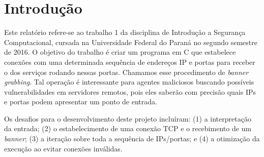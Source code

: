 \documentclass{sig-alternate-05-2015}
\begin{document}
%
\author{
%
%
\alignauthor
Renan Domingos Merlin Greca\\
			\\
\alignauthor
José Robyson Aggio Molinari\\
			\\
}
\date{5 September 2016}

\maketitle

\section{Introdução}
Este relatório refere-se ao trabalho 1 da disciplina de Introdução a Segurança Computacional, cursada na Universidade Federal do Paraná no segundo semestre de 2016.
O objetivo do trabalho é criar um programa em C que estabelece conexões com uma determinada sequência de endereços IP e portas para receber o \banner dos serviços rodando nessas portas.
Chamamos esse procedimento de \textit{banner grabbing}.
Tal operação é interessante para agentes maliciosos buscando possíveis vulnerabilidades em servidores remotos, pois eles saberão com precisão quais IPs e portas podem apresentar um ponto de entrada.

Os desafios para o desenvolvimento deste projeto incluíram: (1) a interpretação da entrada; (2) o estabelecimento de uma conexão TCP e o recebimento de um \textit{banner}; (3) a iteração sobre toda a sequência de IPs/portas; e (4) a otimização da execução ao evitar conexões inválidas.
\end{document}

